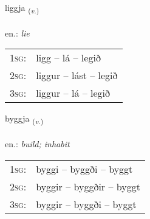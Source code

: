 \documentclass[frontgrid, backgrid]{flacards}\usepackage[]{graphicx}\usepackage[]{xcolor}
\begin{document}
{liggja \small{\textsubscript{(\textit{v.})}} \\[1ex] %
\textphonetic{[lɪca]} \\
en.: \emph{lie} \\  [2ex]
\renewcommand*{\arraystretch}{0.8}
\begin{tabular}{p{1cm}l}
\textsc{1sg}: & ligg -- lá -- legið \\ 
\textsc{2sg}: & liggur -- lást -- legið \\ 
\textsc{3sg}: & liggur -- lá -- legið \\ 
\end{tabular}
}

\renewcommand{\flhead}{\vskip5pt \fboxsep=0pt {\small\bfseries\footnotesize Sagnorð | Verb}}
\renewcommand{\fcfoot}{\vskip5pt \fboxsep=0pt \hspace{2pt}{\small\bfseries\footnotesize 1K}}

\renewcommand{\blhead}{\vskip5pt {\small\bfseries\footnotesize Sagnorð | Verb }}
\renewcommand{\bcfoot}{\vskip5pt \hspace{2pt}{\small\bfseries\footnotesize 1K}}


{byggja \small{\textsubscript{(\textit{v.})}} \\[1ex] %
\textphonetic{[pɪca]} \\
en.: \emph{build; inhabit} \\  [2ex]
\renewcommand*{\arraystretch}{0.8}
\begin{tabular}{p{1cm}l}
\textsc{1sg}: & byggi -- byggði -- byggt \\ 
\textsc{2sg}: & byggir -- byggðir -- byggt \\ 
\textsc{3sg}: & byggir -- byggði -- byggt \\ 
\end{tabular}
}

\renewcommand{\flhead}{\vskip5pt \fboxsep=0pt {\small\bfseries\footnotesize Nafnorð | Noun}}
\renewcommand{\fcfoot}{\vskip5pt \fboxsep=0pt \hspace{2pt}{\small\bfseries\footnotesize 1K}}
\end{document}
